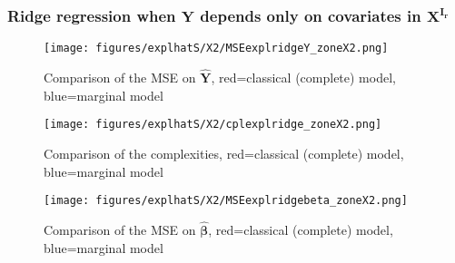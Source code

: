 \documentclass[12pt,a4paper]{report}
\begin{document}
\subsubsection{Ridge regression when $\boldsymbol{Y}$ depends only on covariates in $\boldsymbol{X^{I_r}}$}

\begin{figure}[h!]
	\centering
		  \texttt{[image: figures/explhatS/X2/MSEexplridgeY\_zoneX2.png]}
		\caption{Comparison of the MSE on $\hat{\boldsymbol{Y}}$, red=classical (complete) model, blue=marginal model}\label{MSEexplridgeY_zoneX2}
	\end{figure}
	\begin{figure}[h!]
	\centering
		  \texttt{[image: figures/explhatS/X2/cplexplridge\_zoneX2.png]}
		\caption{Comparison of the complexities, red=classical (complete) model, blue=marginal model}\label{cplexplridge_zoneX2}
	\end{figure}
	\begin{figure}[h!]
	\centering
		  \texttt{[image: figures/explhatS/X2/MSEexplridgebeta\_zoneX2.png]}
		\caption{Comparison of the MSE on $\hat{\boldsymbol{\beta}}$, red=classical (complete) model, blue=marginal model}\label{MSEexplridgebeta_zoneX2}
	\end{figure}
	\FloatBarrier
\end{document}
